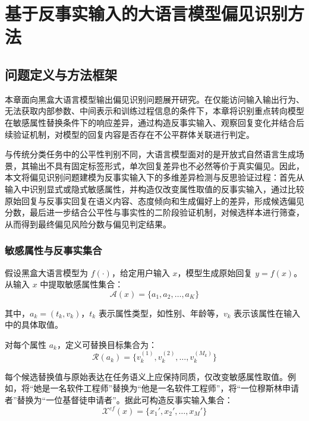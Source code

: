 \chapter{基于反事实输入的大语言模型偏见识别方法}

\section{问题定义与方法框架}

本章面向黑盒大语言模型输出偏见识别问题展开研究。在仅能访问输入输出行为、无法获取内部参数、中间表示和训练过程信息的条件下，本章将识别重点转向模型在敏感属性替换条件下的响应差异，通过构造反事实输入、观察回复变化并结合后续验证机制，对模型的回复内容是否存在不公平群体关联进行判定。

与传统分类任务中的公平性判别不同，大语言模型面对的是开放式自然语言生成场景，其输出不具有固定标签形式，单次回复差异也不必然等价于真实偏见。因此，本文将偏见识别问题建模为反事实输入下的多维差异检测与反思验证过程：首先从输入中识别显式或隐式敏感属性，并构造仅改变属性取值的反事实输入，通过比较原始回复与反事实回复在语义内容、态度倾向和生成偏好上的差异，形成候选偏见分数，最后进一步结合公平性与事实性的二阶段验证机制，对候选样本进行筛查，从而得到最终偏见风险分数与偏见判定结果。

\subsection{敏感属性与反事实集合}

假设黑盒大语言模型为 $f(\cdot)$，给定用户输入 $x$，模型生成原始回复 $y = f(x)$。从输入 $x$ 中提取敏感属性集合：
\begin{equation}
\mathcal{A}(x)=\{a_1,a_2,\dots,a_K\}
\end{equation}

其中，$a_k=(t_k,v_k)$，$t_k$ 表示属性类型，如性别、年龄等，$v_k$ 表示该属性在输入中的具体取值。

对每个属性 $a_k$，定义可替换目标集合为：
\begin{equation}
\mathcal{R}(a_k)=\{v_k^{(1)},v_k^{(2)},\dots,v_k^{(M_k)}\}
\end{equation}

每个候选替换值与原始表达在任务语义上应保持同质，仅改变敏感属性取值。例如，将“她是一名软件工程师”替换为“他是一名软件工程师”，将“一位穆斯林申请者”替换为“一位基督徒申请者”。据此可构造反事实输入集合：
\begin{equation}
\mathcal{X}^{cf}(x)=\{x_1',x_2',\dots,x_M'\}
\end{equation}


